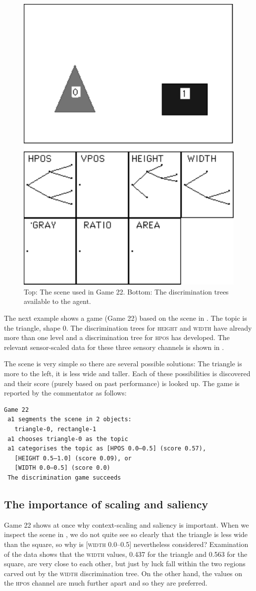 \begin{figure}[htbp]
  \centerline{\includegraphics[width=.40\textwidth]{chap4/figs/scene22.pdf}}
\caption{\label{scene3}Top: The scene used in Game 22. 
Bottom: The discrimination trees available to the
agent.}
\end{figure}
\enlargethispage{1\baselineskip}
The next example shows a game (Game 22) based on the scene 
in . The topic is the triangle, shape 0. 
The discrimination trees for 
\textsc{height} and \textsc{width} have already more than one level and 
a discrimination tree for \textsc{hpos} has developed.
The relevant sensor-scaled data for these three sensory
channels is shown in . 

The scene is very simple so there are several possible
solutions: The triangle is more to the left, it is less wide 
and taller. Each of these possibilities is discovered
and their score (purely based on past performance) is 
looked up. The game is reported by the commentator
as follows: 
\begin{verbatim}
Game 22
 a1 segments the scene in 2 objects:  
   triangle-0, rectangle-1
 a1 chooses triangle-0 as the topic 
 a1 categorises the topic as [HPOS 0.0–0.5] (score 0.57), 
   [HEIGHT 0.5–1.0] (score 0.09), or 
   [WIDTH 0.0–0.5] (score 0.0) 
 The discrimination game succeeds
\end{verbatim}

\subsection{The importance of scaling and saliency}

Game 22 shows at once why context-scaling 
and saliency is important. When we inspect the scene in 
, we do not quite see so clearly 
that the triangle is less wide than the square, so why
is [\textsc{width} 0.0–0.5] 
nevertheless considered? Examination of the data shows
that the \textsc{width} values, 0.437 for the triangle
and 0.563 for the square, are very close 
to each other, but just by luck fall within 
the two regions carved out by the \textsc{width} discrimination
tree. On the other hand, the values on the \textsc{hpos} channel 
are much further apart and so they are preferred. 

